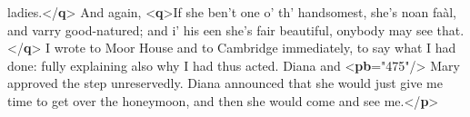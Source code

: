 \documentclass[11pt,twoside]{article}\makeatletter
\begin{document}
\begin{shaded}
\hspace*{6pt}\hspace*{6pt}\hspace*{6pt}\hspace*{6pt} ladies.{</\textbf{q}>} And again, {<\textbf{q}>}If she ben't one o' th'\mbox{}\newline 
\hspace*{6pt}\hspace*{6pt}\hspace*{6pt}\hspace*{6pt} handsomest, she's noan faàl, and varry good-natured;\mbox{}\newline 
\hspace*{6pt}\hspace*{6pt}\hspace*{6pt}\hspace*{6pt} and i' his een she's fair beautiful, onybody may see\mbox{}\newline 
\hspace*{6pt}\hspace*{6pt}\hspace*{6pt}\hspace*{6pt} that.{</\textbf{q}>}\mbox{}\newline 
{}\mbox{}\newline 
{}I wrote to Moor House and to Cambridge immediately, to\mbox{}\newline 
\hspace*{6pt}\hspace*{6pt} say what I had done: fully explaining also why I had thus\mbox{}\newline 
\hspace*{6pt}\hspace*{6pt} acted. Diana and {<\textbf{pb}\hspace*{6pt}{n}="{475}"/>} Mary approved the step\mbox{}\newline 
\hspace*{6pt}\hspace*{6pt} unreservedly. Diana announced that she would just give me\mbox{}\newline 
\hspace*{6pt}\hspace*{6pt} time to get over the honeymoon, and then she would come and\mbox{}\newline 
\hspace*{6pt}\hspace*{6pt} see me.{</\textbf{p}>}\mbox{}\newline 

\end{shaded}
\end{document}
